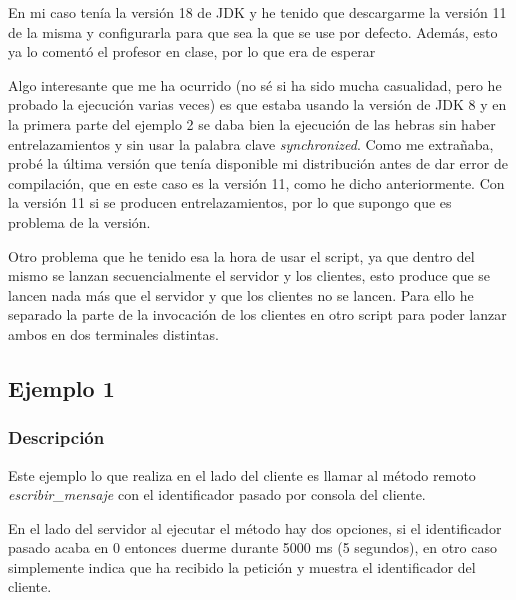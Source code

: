 \documentclass{article}
\begin{document}
En mi caso tenía la versión 18 de JDK y he tenido que descargarme la versión 11 de la misma y configurarla para que sea la que se use por defecto. Además, esto ya lo comentó el profesor en clase, por lo que era de esperar

\bigskip

Algo interesante que me ha ocurrido (no sé si ha sido mucha casualidad, pero he probado la ejecución varias veces) es que estaba usando la versión de JDK 8 y en la primera parte del ejemplo 2 se daba bien la ejecución de las hebras sin haber entrelazamientos y sin usar la palabra clave \textit{synchronized}. Como me extrañaba, probé la última versión que tenía disponible mi distribución antes de dar error de compilación, que en este caso es la versión 11, como he dicho anteriormente. Con la versión 11 si se producen entrelazamientos, por lo que supongo que es problema de la versión.

\bigskip
Otro problema que he tenido esa la hora de usar el script, ya que dentro del mismo se lanzan secuencialmente el servidor y los clientes, esto produce que se lancen nada más que el servidor y que los clientes no se lancen. Para ello he separado la parte de la invocación de los clientes en otro script para poder lanzar ambos en dos terminales distintas.

\subsection{Ejemplo 1}
\subsubsection{Descripción}
Este ejemplo lo que realiza en el lado del cliente es llamar al método remoto \textit{escribir\_mensaje} con el identificador pasado por consola del cliente.

\bigskip

En el lado del servidor al ejecutar el método hay dos opciones, si el identificador pasado acaba en 0 entonces duerme durante 5000 ms (5 segundos), en otro caso simplemente indica que ha recibido la petición y muestra el identificador del cliente.
\end{document}
